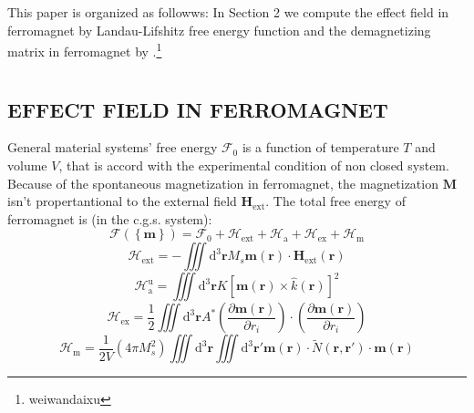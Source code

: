 \documentclass{article}
\begin{document}
This paper is organized as followws: In Section 2 we compute the effect field in ferromagnet by Landau-Lifshitz free energy function and the demagnetizing matrix in ferromagnet by .\footnote{weiwandaixu}
\section{}
\subsection{EFFECT FIELD IN FERROMAGNET}
General material systems' free energy $\mathcal{F}_0$ is a function of temperature $T$ and volume $V$, that is accord with the experimental condition of non closed system. Because of the spontaneous magnetization in ferromagnet, the magnetization $\bm{M}$ isn't propertantional to the external field $\bm{H}_\text{ext}$. The total free energy of ferromagnet is (in the c.g.s. system):
\begin{equation}
\mathcal{F}\left(\left\{\bm{m}\right\}\right)=\mathcal{F}_0+\mathcal{H}_\text{ext}+\mathcal{H}_\text{a}+\mathcal{H}_\text{ex}+\mathcal{H}_\text{m}\label{eq8}
\end{equation}
\begin{equation}
\mathcal{H}_\text{ext}=-\iiint\mathrm{d}^3\bm{r} M_s\bm{m}\left(\bm{r}\right)\cdot \bm{H}_\text{ext}\left(\bm{r}\right)\label{eq9}
\end{equation}
\begin{equation}
\mathcal{H}_\text{a}^\text{u}=\iiint \mathrm{d}^3\bm{r} K\left[\bm{m}\left(\bm{r}\right)\times \hat{k}\left(\bm{r}\right)\right]^2\label{eq10}
\end{equation}
\begin{equation}
\mathcal{H}_\text{ex}=\frac{1}{2}\iiint \mathrm{d}^3 \bm{r} A^*\left(\frac{\partial \bm{m}\left(\bm{r}\right)}{\partial r_i}\right)\cdot \left(\frac{\partial \bm{m}\left(\bm{r}\right)}{\partial r_i}\right)\label{eq11}
\end{equation}
\begin{equation}
\mathcal{H}_\text{m}=\frac{1}{2V}\left(4\pi M_s^2\right)\iiint \mathrm{d}^3\bm{r}\iiint \mathrm{d}^{3}\bm{r}'\bm{m}\left(\bm{r}\right)\cdot\tilde{N}\left(\bm{r},\bm{r}'\right) \cdot\bm{m}\left(\bm{r}\right)\label{eq12}
\end{equation}
\end{document}
